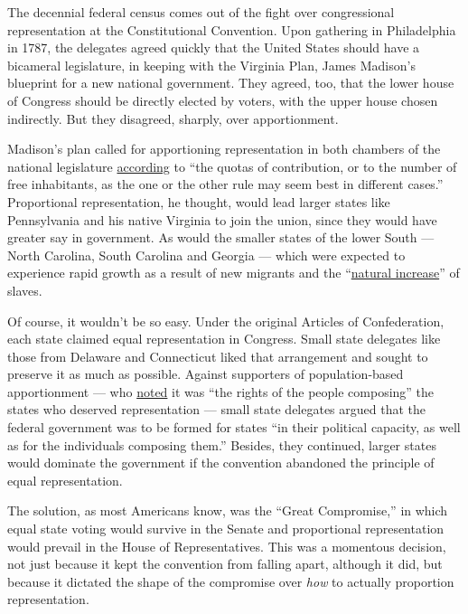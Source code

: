 The decennial federal census comes out of the fight over congressional
representation at the Constitutional Convention. Upon gathering in
Philadelphia in 1787, the delegates agreed quickly that the United
States should have a bicameral legislature, in keeping with the Virginia
Plan, James Madison's blueprint for a new national government. They
agreed, too, that the lower house of Congress should be directly elected
by voters, with the upper house chosen indirectly. But they disagreed,
sharply, over apportionment.

Madison's plan called for apportioning representation in both chambers
of the national legislature
\href{https://avalon.law.yale.edu/18th_century/vatexta.asp}{according}
to ``the quotas of contribution, or to the number of free inhabitants,
as the one or the other rule may seem best in different cases.''
Proportional representation, he thought, would lead larger states like
Pennsylvania and his native Virginia to join the union, since they would
have greater say in government. As would the smaller states of the lower
South --- North Carolina, South Carolina and Georgia --- which were
expected to experience rapid growth as a result of new migrants and the
``\href{https://www.monticello.org/thomas-jefferson/jefferson-slavery/the-business-of-slavery-at-monticello/}{natural
increase}'' of slaves.

Of course, it wouldn't be so easy. Under the original Articles of
Confederation, each state claimed equal representation in Congress.
Small state delegates like those from Delaware and Connecticut liked
that arrangement and sought to preserve it as much as possible. Against
supporters of population-based apportionment --- who
\href{https://avalon.law.yale.edu/18th_century/debates_629.asp}{noted}
it was ``the rights of the people composing'' the states who deserved
representation --- small state delegates argued that the federal
government was to be formed for states ``in their political capacity, as
well as for the individuals composing them.'' Besides, they continued,
larger states would dominate the government if the convention abandoned
the principle of equal representation.

The solution, as most Americans know, was the ``Great Compromise,'' in
which equal state voting would survive in the Senate and proportional
representation would prevail in the House of Representatives. This was a
momentous decision, not just because it kept the convention from falling
apart, although it did, but because it dictated the shape of the
compromise over \emph{how} to actually proportion representation.

